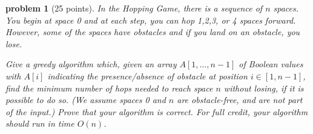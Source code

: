 \documentclass[10pt]{article}
\newtheorem{problem}{\sc\color{cit}problem}
\begin{document}

\newpage
\begin{problem}[25 points]
In the Hopping Game, there is a sequence of $n$ spaces.  You begin at space 0 and at each step, you can hop 1,2,3, or 4 spaces forward. However, some of the spaces have obstacles and if you land on an obstacle, you lose. 

Give a greedy algorithm which, given an array $A[1, \ldots, n-1]$ of Boolean values with $A[i]$ indicating the presence/absence of obstacle at position $i \in [1, n-1]$, find the minimum number of hops needed to reach space $n$ without losing, if it is possible to do so.  (We assume spaces 0 and $n$ are obstacle-free, and are not part of the input.)  Prove that your algorithm is correct. For full credit, your algorithm should run in time $O(n)$.
\end{problem}
\end{document}
